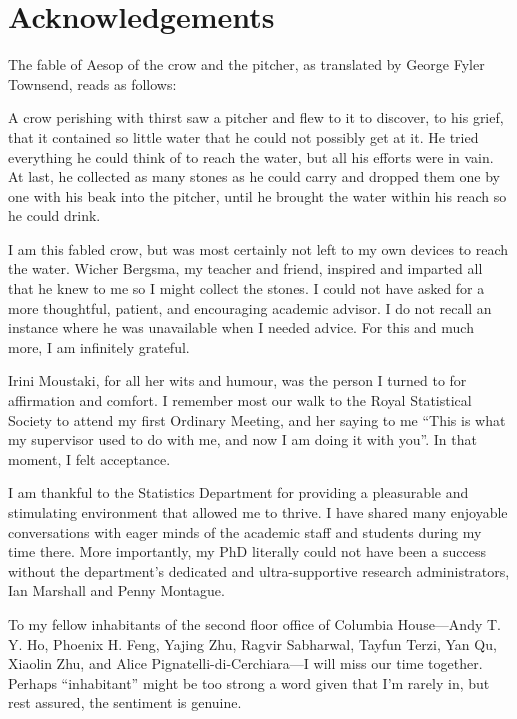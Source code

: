 \documentclass[11pt,twoside,openright,showframe]{report}
\begin{document}
\chapter*{Acknowledgements} 

The fable of Aesop of the crow and the pitcher, as translated by George Fyler Townsend, reads as follows:

\begingroup
\singlespacing
\begin{displayquote}
A crow perishing with thirst saw a pitcher and flew to it to discover, to his grief, that it contained so little water that he could not possibly get at it. 
He tried everything he could think of to reach the water, but all his efforts were in vain. 
At last, he collected as many stones as he could carry and dropped them one by one with his beak into the pitcher, until he brought the water within his reach so he could drink.
\end{displayquote}
\endgroup

I am this fabled crow, but was most certainly not left to my own devices to reach the water.
Wicher Bergsma, my teacher and friend, inspired and imparted all that he knew to me so I might collect the stones.
I could not have asked for a more thoughtful, patient, and encouraging academic advisor.
I do not recall an instance where he was unavailable when I needed  advice.
For this and much more, I am infinitely grateful.

Irini Moustaki, for all her wits and humour, was the person I turned to for affirmation and comfort. 
I remember most our walk to the Royal Statistical Society to attend my first Ordinary Meeting, and her saying to me ``This is what my supervisor used to do with me, and now I am doing it with you''. 
In that moment, I felt acceptance.

I am thankful to the Statistics Department for providing a pleasurable and stimulating environment that allowed me to thrive.
I have shared many enjoyable conversations with eager minds of the academic staff and students during my time there.
More importantly, my PhD literally could not have been a success without the department's dedicated and ultra-supportive research administrators, Ian Marshall and Penny Montague.

To my fellow inhabitants of the second floor office of Columbia House---Andy T. Y. Ho, Phoenix H. Feng, Yajing Zhu, Ragvir Sabharwal, Tayfun Terzi, Yan Qu, Xiaolin Zhu, and Alice Pignatelli-di-Cerchiara---I will miss our time together.
Perhaps ``inhabitant'' might be too strong a word given that I'm rarely in, but rest assured, the sentiment is genuine.
\end{document}
